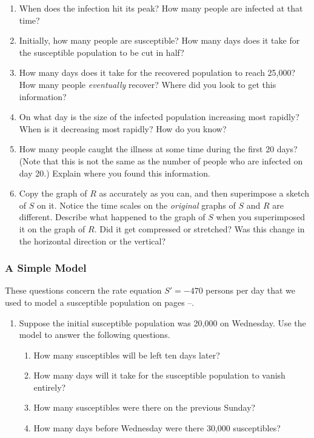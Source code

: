\enlargethispage*{10pt}

\begin{enumerate}
\item When does the infection hit its peak? How many
people are infected at that time?


\item Initially, how many people are susceptible?  How many days does
it take for the susceptible population to be cut in half?


\item How many days does it take for the recovered population to reach
25,000?  How many people {\em eventually\/} recover?  Where did you
look to get this information?


\item On what day is the size of the infected population increasing
most rapidly?  When is it decreasing most rapidly?  How do you know?


\item How many people caught the illness at some time during the first
20 days?  (Note that this is not the same as the number of people who
are infected on day 20.)  Explain where you found this information.


\item Copy the graph of $R$ as accurately as you can, and then
superimpose a sketch of $S$ on it.  Notice the time scales on the {\em
  original\/} graphs of $S$ and $R$ are different.  Describe what
happened to the graph of $S$ when you superimposed it on the graph of
$R$.  Did it get compressed or stretched?  Was this change in the
horizontal direction or the vertical?

\end{enumerate}
\subsubsection{A Simple Model}
\label{subsubsec:a-simple-model}

These questions concern the rate equation $S' = -470$ persons per day
that we used to model a susceptible population on
pages \pageref{`modelstart'}--\pageref{`modelend'}.


\begin{enumerate}
\item Suppose the initial susceptible population was 20,000 on
Wednesday.  Use the model to answer the following questions.

  \begin{enumerate}
  \item How many susceptibles will be left ten days later?

  \item How many days will it take for the susceptible population to
vanish entirely?

  \item How many susceptibles were there on the previous Sunday?

  \item How many days before Wednesday were there 30,000 susceptibles?



\end{enumerate}
\end{enumerate}
